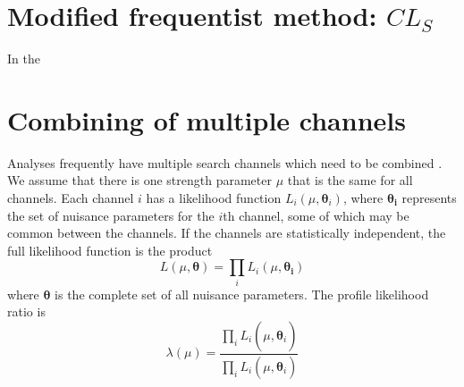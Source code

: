 \section{Modified frequentist method: $CL_{S}$}
In the

\section{Combining of multiple channels}
Analyses frequently have multiple search channels which need to be combined \cite{2011-Cowan-et-al}. We assume that there is one strength parameter $\mu$ that is the same for all channels. Each channel $i$ has a likelihood function $L_{i} (\mu, \boldsymbol{\theta}_i)$, where $\boldsymbol{\theta_i}$ represents the set of nuisance parameters for the $i$th channel, some of which may be common between the channels. If the channels are statistically independent, the full likelihood function is the product
\begin{equation}
    L(\mu, \boldsymbol{\theta}) = \prod_{i} L_i (\mu, \boldsymbol{\theta_i})
\end{equation}
where $\boldsymbol{\theta}$ is the complete set of all nuisance parameters. The profile likelihood ratio is 
\begin{equation}
    \lambda(\mu) = \frac{ \prod_i L_i(\mu, \hat{\hat{\boldsymbol{\theta}}}_i) }{ \prod_i L_i(\mu, \hat{\boldsymbol{\theta}}_i)}
\end{equation}

